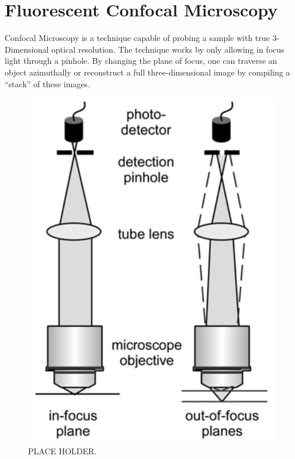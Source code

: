 
\section{Fluorescent Confocal Microscopy}
Confocal Microscopy is a technique capable of probing a sample with true 3-Dimensional optical resolution. The technique works by only allowing in focus light through a pinhole. By changing the plane of focus, one can traverse an object azimuthally or reconstruct a full three-dimensional image by compiling a ``stack'' of these images.  

\begin{figure}
	
	\centering
	\vspace{-1.2em}
	\includegraphics[width=\linewidth]{confocal_stuff/confocal_orig_fi_1-1}
	\caption[Confocal Optics 1]{PLACE HOLDER.}
	\label{fig:confocal_1}
	
	
\end{figure}
	
